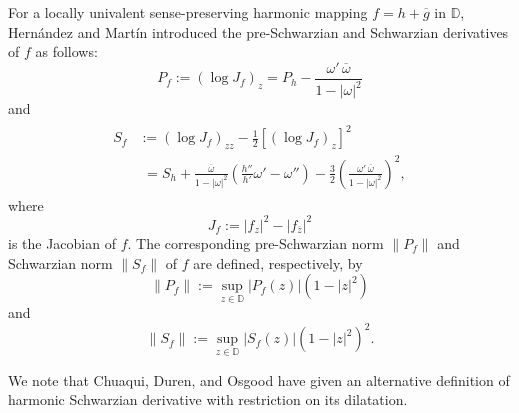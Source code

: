 \documentclass[11pt, reqno]{amsart}
\numberwithin{equation}{section}
\newcommand{\abs}[1]{\left\vert#1\right\vert}
\newcommand{\D}{\mbox{$\mathbb{D}$}}
\begin{document}

For a locally univalent sense-preserving harmonic mapping $f=h+\overline{g}$ in $\D$, Hern\'{a}ndez and Mart\'{i}n \cite{hm} introduced
the pre-Schwarzian and Schwarzian derivatives of $f$ as follows:
$$P_f:=\left(\log J_f\right)_z=P_h-\frac{\omega'\,\overline{\omega}}{1-\abs{\omega}^2}$$ and
\begin{align*}\begin{split}S_f&:=\left(\log J_f\right)_{zz}-\frac{1}{2}\left[\left(\log J_f\right)_z\right]^2\\&\, \, =S_h+\frac{\overline{\omega}}{1-\abs{\omega}^2}\left(\frac{h''}{h'}\omega'-\omega''\right)
-\frac{3}{2}\left(\frac{\omega'\,\overline{\omega}}{1-\abs{\omega}^2}\right)^2,\end{split}\end{align*}
where $$J_f:=\abs{f_z}^2-\abs{f_{\overline{z}}}^2$$ is the Jacobian of $f$.
The corresponding pre-Schwarzian norm $\|P_f\|$ and Schwarzian norm
$\|S_f\|$ of $f$ are defined, respectively, by
$$\|P_f\|:=\sup\limits_
{z\in\mathbb{D}}
\abs{P_f(z)}\left(1-\abs{z}^2\right)$$
and
$$\|S_f\|:=\sup\limits_
{z\in\mathbb{D}}
\abs{S_f(z)}\left(1-\abs{z}^2\right)^2.$$

We note that Chuaqui, Duren, and Osgood \cite{cdo} have given an alternative definition of harmonic Schwarzian derivative
with restriction on its dilatation.  
\end{document}
